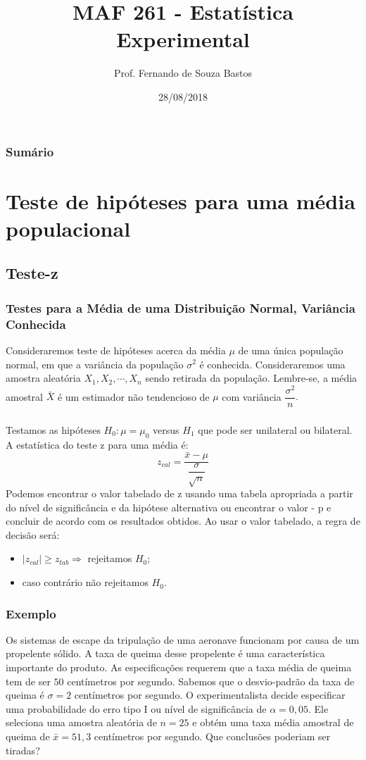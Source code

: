 \documentclass[14pt,aspectratio=1610]{beamer}
\title{MAF 261 - Estatística Experimental}
\author{Prof. Fernando de Souza Bastos}
\institute{Instituto de Ciências Exatas e Tecnológicas\texorpdfstring{\\ Universidade Federal de Viçosa}{}\texorpdfstring{\\ Campus UFV - Florestal}{}}
\date{28/08/2018}
\newcommand{\bx}{\ensuremath{\bar{x}}}
\newcommand{\Ho}{\ensuremath{H_{0}}}
\newcommand{\Hi}{\ensuremath{H_{1}}}
\begin{document}


\frame{\titlepage}

\begin{frame}{}
\frametitle{\bf Sumário}
\tableofcontents
\end{frame}
\section{Teste de hipóteses para uma média populacional}
\subsection{Teste-z}
\begin{frame}{}
\frametitle{Testes para a Média de uma Distribuição Normal, Variância Conhecida}
\begin{block}{}
\justifying
Consideraremos teste de hipóteses acerca da média $\mu$ de uma única população normal, em que a variância da população $\sigma^{2}$ é conhecida. Consideraremos uma amostra aleatória $X_{1}, X_{2},\cdots, X_{n}$ sendo retirada da população. Lembre-se, a média amostral $\bar{X}$ é um estimador não tendencioso de $\mu$ com 
variância $\dfrac{\sigma^{2}}{n}.$
\end{block}
\end{frame}

\begin{frame}{}
\frametitle{}
\begin{block}{}
\justifying
Testamos as hipóteses $\Ho:\mu=\mu_{0}$ versus $\Hi$ que pode ser unilateral ou bilateral. A estatística do teste z para uma média é:
$$z_{cal}=\dfrac{\bx-\mu}{\dfrac{\sigma}{\sqrt{n}}}$$
Podemos encontrar o valor tabelado de z usando uma tabela apropriada a partir do nível de significância e da hipótese alternativa ou 
encontrar o valor - p e concluir de acordo com os resultados obtidos. Ao usar o valor tabelado, a regra de decisão será:
\begin{itemize}
\item $|z_{cal}|\geq z_{tab}\Rightarrow$ rejeitamos $\Ho;$
\item caso contrário não rejeitamos $\Ho.$
\end{itemize}
\end{block}
\end{frame}

\begin{frame}{}
\frametitle{Exemplo}
\begin{block}{}
\justifying
Os sistemas de escape da tripulação de uma aeronave funcionam por causa de um propelente sólido. A taxa de queima desse propelente é uma característica importante 
do produto. As especificações requerem que a taxa média de queima tem de ser $50$ centímetros por segundo. Sabemos que o desvio-padrão da taxa de queima é 
$\sigma = 2$ centímetros por segundo. O experimentalista decide especificar uma probabilidade do erro tipo I ou nível de significância de $\alpha = 0,05.$ Ele seleciona 
uma amostra aleatória de $n = 25$ e obtém uma taxa média amostral de queima de $\bx = 51,3$ centímetros por segundo. Que conclusões poderiam ser tiradas?
\end{block}
\end{frame}
\end{document}
